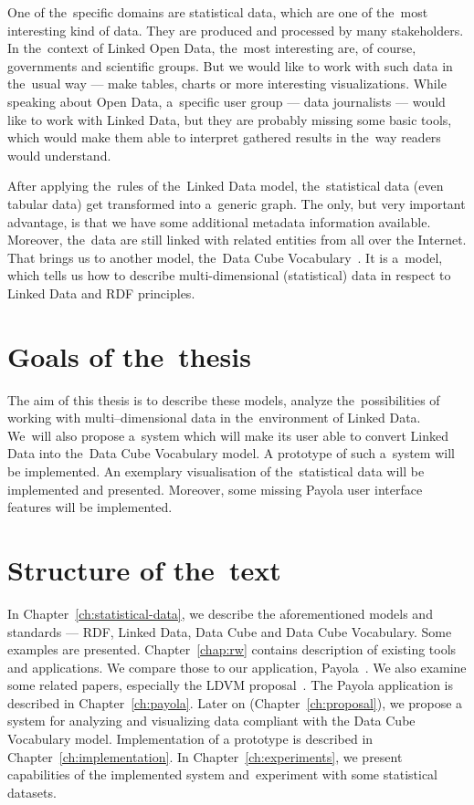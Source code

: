 One of the~specific domains are statistical data, which are one of the~most interesting kind
of data. They are produced and processed by many stakeholders. In the~context of
Linked Open Data, the~most interesting are, of course, governments and scientific groups.
But we would like to work with such data in the~usual
way --- make tables, charts or more interesting visualizations. While speaking about Open Data, a~specific
user group --- data journalists --- would like to work with Linked Data, but they are probably
missing some basic tools, which would make them able to interpret gathered results
in the~way readers would understand.

After applying the~rules of the~Linked Data model, the~statistical data (even tabular data)
get transformed into a~generic graph. The only, but very important advantage, is that we have some additional
metadata information available. Moreover, the~data are still linked with related entities from all over the Internet.
That brings
us to another model, the~Data Cube Vocabulary~\cite{dcv}. It is a~model, which tells us how to describe
multi-dimensional (statistical) data in respect to Linked Data and RDF 
principles.

\section{Goals of the~thesis}

The aim of this thesis is to describe these models, analyze the~possibilities of 
working
with multi--dimensional data in the~environment of Linked Data. We~will also propose a~system
which will make its user able to convert Linked Data into the~Data Cube Vocabulary model.
A prototype of such a~system will be implemented. An exemplary visualisation of the~statistical
data will be implemented and presented. Moreover, some missing Payola user interface features 
will be implemented.

\section{Structure of the~text}
In Chapter~\ref{ch:statistical-data}, we describe the aforementioned 
models and standards --- RDF, Linked Data, Data Cube and Data Cube Vocabulary. 
Some examples are presented. Chapter~\ref{chap:rw} contains description of 
existing tools and applications. We compare those to our application, Payola~\cite{payola}.
We also examine some related papers, especially the LDVM proposal~\cite{ldvm}. 
The Payola application is described in Chapter~\ref{ch:payola}. Later on (Chapter~\ref{ch:proposal}),
we propose a system
for analyzing and visualizing data compliant with the Data Cube Vocabulary model.
Implementation of a prototype is described in Chapter~\ref{ch:implementation}.
In Chapter~\ref{ch:experiments}, we present capabilities of the implemented system
and~experiment with some statistical datasets.